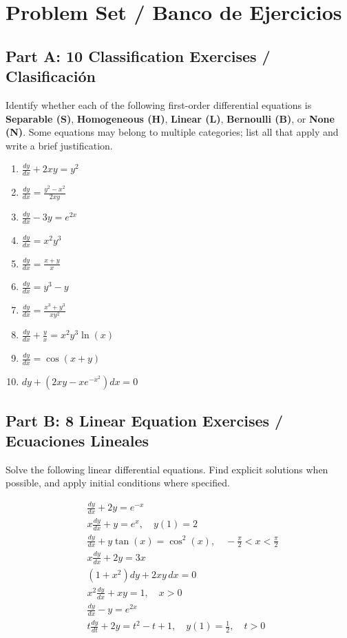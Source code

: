 \documentclass[11pt,letterpaper]{article}
\begin{document}
\newpage
\section{Problem Set / Banco de Ejercicios}

\subsection*{Part A: 10 Classification Exercises / Clasificación}
Identify whether each of the following first-order differential equations is \textbf{Separable (S)}, \textbf{Homogeneous (H)}, \textbf{Linear (L)}, \textbf{Bernoulli (B)}, or \textbf{None (N)}. Some equations may belong to multiple categories; list all that apply and write a brief justification.

\begin{enumerate}[label=\textbf{\arabic*.}]
    \item $\frac{dy}{dx} + 2xy = y^2$
    \item $\frac{dy}{dx} = \frac{y^2-x^2}{2xy}$
    \item $\frac{dy}{dx} - 3y = e^{2x}$
    \item $\frac{dy}{dx} = x^2 y^3$
    \item $\frac{dy}{dx} = \frac{x+y}{x}$
    \item $\frac{dy}{dx} = y^3 - y$
    \item $\frac{dy}{dx} = \frac{x^3 + y^3}{xy^2}$
    \item $\frac{dy}{dx} + \frac{y}{x} = x^2 y^3 \ln(x)$
    \item $\frac{dy}{dx} = \cos(x+y)$
    \item $dy + \left(2xy - x e^{-x^2}\right)dx = 0$
\end{enumerate}

\subsection*{Part B: 8 Linear Equation Exercises / Ecuaciones Lineales}
Solve the following linear differential equations. Find explicit solutions when possible, and apply initial conditions where specified.

\begin{align}
    & \frac{dy}{dx} + 2y = e^{-x} \label{eq:lin1} \\
    & x\frac{dy}{dx} + y = e^x, \quad y(1) = 2 \label{eq:lin2} \\
    & \frac{dy}{dx} + y \tan(x) = \cos^2(x), \quad -\frac{\pi}{2} < x < \frac{\pi}{2} \label{eq:lin3} \\
    & x\frac{dy}{dx} + 2y = 3x \label{eq:lin4} \\
    & (1+x^2)dy + 2xy\,dx = 0 \label{eq:lin5} \\
    & x^2 \frac{dy}{dx} + xy = 1, \quad x > 0 \label{eq:lin6} \\
    & \frac{dy}{dx} - y = e^{2x} \label{eq:lin7} \\
    & t \frac{dy}{dt} + 2y = t^2 - t + 1, \quad y(1) = \frac{1}{2}, \quad t > 0 \label{eq:lin8}
\end{align}
\end{document}

